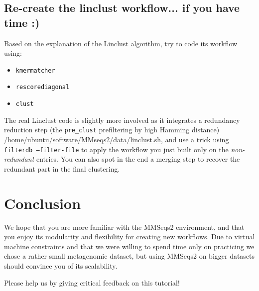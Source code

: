 \documentclass{scrartcl}
\begin{document}
\subsection{Re-create the linclust workflow... if you have time :)}

Based on the explanation of the Linclust algorithm, try to code its workflow using:
\begin{itemize}
    \item \texttt{kmermatcher}
    \item \texttt{rescorediagonal}
    \item \texttt{clust}
\end{itemize}

The real Linclust code is slightly more involved as it integrates a redundancy reduction step (the \texttt{pre_clust} prefiltering by high Hamming distance) \url{/home/ubuntu/software/MMseqs2/data/linclust.sh}, and use a trick using \texttt{filterdb --filter-file} to apply the workflow you just built only on the \textit{non-redundant} entries. You can also spot in the end a merging step to recover the redundant part in the final clustering.


\section{Conclusion}

We hope that you are more familiar with the MMSeqs2 environment, and that you enjoy its modularity and flexibility for creating new workflows. Due to virtual machine constraints and that we were willing to spend time only on practicing we chose a rather small metagenomic dataset, but using MMSeqs2 on bigger datasets should convince you of its scalability.

Please help us by giving critical feedback on this tutorial!




\end{document}

